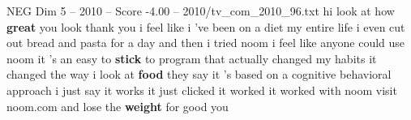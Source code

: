\begin{textsample}{NEG Dim 5 – 2010 – Score -4.00 – 2010/tv\_com\_2010\_96.txt}  \label{ex:f5_neg_021}
hi look at how \textbf{great} you look thank you i feel like i 've been on a diet my entire life i even cut out bread and pasta for a day and then i tried noom i feel like anyone could use noom it 's an easy to \textbf{stick} to program that actually changed my habits it changed the way i look at \textbf{food} they say it 's based on a cognitive behavioral approach i just say it works it just clicked it worked it worked with noom visit noom.com and lose the \textbf{weight} for good you

\end{textsample}
